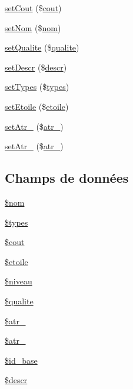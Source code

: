 \begin{DoxyCompactItemize}
\item 
\mbox{\hyperlink{class_stuff_ae2d819b501f4b8bd815e6318549f42fa}{set\+Cout}} (\$\mbox{\hyperlink{class_stuff_a3a67cfe36aa054dfc42f99a6883bb408}{cout}})
\item 
\mbox{\hyperlink{class_stuff_aa7fef5150533f454fcfed30206a31d45}{set\+Nom}} (\$\mbox{\hyperlink{class_stuff_a38d4592ddc6ed1f09868ea5b7a82fdb9}{nom}})
\item 
\mbox{\hyperlink{class_stuff_a7d2dbf87cc016d1131f7dd59210a279c}{set\+Qualite}} (\$\mbox{\hyperlink{class_stuff_a30e7d02611dc95bd7481781e503f575d}{qualite}})
\item 
\mbox{\hyperlink{class_stuff_ab1d52c190f51753afd58ef9b54060c94}{set\+Descr}} (\$\mbox{\hyperlink{class_stuff_a1b91ba84e3eb06abc49dc61810f97454}{descr}})
\item 
\mbox{\hyperlink{class_stuff_ae5e915d228462b653eeb32f277cd86d7}{set\+Types}} (\$\mbox{\hyperlink{class_stuff_a31db818ab10befbdba9c8d24d62dbb90}{types}})
\item 
\mbox{\hyperlink{class_stuff_a71d02dca0478b89b261d94cc53cde5de}{set\+Etoile}} (\$\mbox{\hyperlink{class_stuff_a60e42cc89da2a51716a685ad1cbe8b44}{etoile}})
\item 
\mbox{\hyperlink{class_stuff_a87e45b3acdcbf5190778daefa47d877e}{set\+Atr\+\_}} (\$\mbox{\hyperlink{class_stuff_a4afe7d4f33396df453f6fdc9c0ba3aa5}{atr\+\_}})
\item 
\mbox{\hyperlink{class_stuff_acdb2a46068bf1f19aca527a971667cbe}{set\+Atr\+\_}} (\$\mbox{\hyperlink{class_stuff_a1bb01959da153fe1aacf0b3fe5454756}{atr\+\_}})
\end{DoxyCompactItemize}
\subsection*{Champs de données}
\begin{DoxyCompactItemize}
\item 
\mbox{\hyperlink{class_stuff_a483af054953bae13906012fae9cb1c0e}{\$nom}}
\item 
\mbox{\hyperlink{class_stuff_a1c7a83697898f22a8ef9ccdcb296d9ca}{\$types}}
\item 
\mbox{\hyperlink{class_stuff_a73bdc82076db4b6966704f0ca381bb27}{\$cout}}
\item 
\mbox{\hyperlink{class_stuff_a6b908457466c4c186e8ed78f8f011f18}{\$etoile}}
\item 
\mbox{\hyperlink{class_stuff_a0a814c87c774e0edc5dca84f127d2844}{\$niveau}}
\item 
\mbox{\hyperlink{class_stuff_a928b6a9a6bd623efbcfd4ba2f9e51d59}{\$qualite}}
\item 
\mbox{\hyperlink{class_stuff_a1d53fb4decffa46e91d7d97af818ed11}{\$atr\+\_}}
\item 
\mbox{\hyperlink{class_stuff_ae58100a21fb46de944460d1e5599d68e}{\$atr\+\_}}
\item 
\mbox{\hyperlink{class_stuff_a02fb472295a6c81fccbf38123d83b9e1}{\$id\+\_\+base}}
\item 
\mbox{\hyperlink{class_stuff_aa018e85da25ab059d71d7b1d28ec8b2d}{\$descr}}
\end{DoxyCompactItemize}

